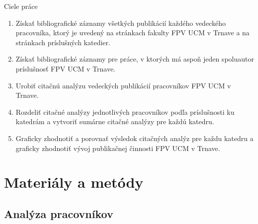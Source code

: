 \documentclass{beamer}
\begin{document}
\begin{frame}{Ciele práce}
  \begin{enumerate}
  \item<1-> Získať bibliografické záznamy všetkých publikácií každého vedeckého
    pracovníka, ktorý je uvedený na stránkach fakulty FPV UCM v Trnave a na
    stránkach príslušných katedier.
  \item<2-> Získať bibliografické záznamy pre práce, v ktorých má aspoň jeden
    spoluautor príslušnosť FPV UCM v Trnave.
  \item<3-> Urobiť citačnú analýzu vedeckých publikácií pracovníkov FPV UCM v
    Trnave.
  \item<4-> Rozdeliť citačné analýzy jednotlivých pracovníkov podľa príslušnosti
    ku katedrám a vytvoriť sumárne citačné analýzy pre každú katedru.
  \item<5-> Graficky zhodnotiť a porovnať výsledok citačných analýz pre každu
    katedru a graficky zhodnotiť vývoj publikačnej činnosti FPV UCM v Trnave.
  \end{enumerate}
\end{frame}


\section{Materiály a metódy}


%
%

%
%


\subsection{Analýza pracovníkov}
\end{document}
